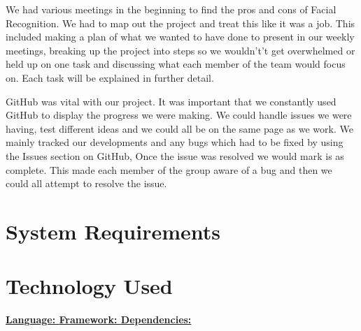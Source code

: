 \documentclass{article}
\begin{document}
We had various meetings in the beginning to find the pros and cons of Facial Recognition. We had to map out the project and treat this like it was a job. This included making a plan of what we wanted to have done to present in our weekly meetings, breaking up the project into steps so we wouldn't’t get overwhelmed or held up on one task and discussing what each member of the team would focus on. Each task will be explained in further detail.

GitHub was vital with our project. It was important that we constantly used GitHub to display the progress we were making. We could handle issues we were having, test different ideas and we could all be on the same page as we work. We mainly tracked our developments and any bugs which had to be fixed by using the Issues section on GitHub, Once the issue was resolved we would mark is as complete. This made each member of the group aware of a bug and then we could all attempt to resolve the issue.

\maketitle
\section{System Requirements}
 \newline
{}\newline
{}\newline
{}

\maketitle
\section{Technology Used}
\textbf{\underline{Language: }}\newline
\newline
{}\newline
\newline
\textbf{\underline{Framework: }}\newline
\newline
{}\newline
\newline
\textbf{\underline{Dependencies: }}\newline
\newline
{}\newline
{}\newline
{}\newline
{}\newline
\newline
\newline
\newline
\newline
\newline
\end{document}
